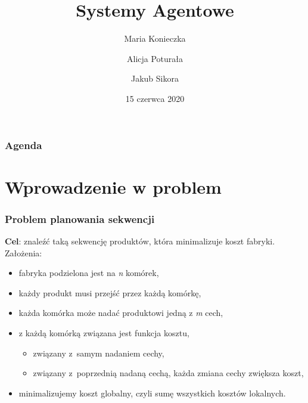 \documentclass{beamer}
\title[SAG - Projekt]{Systemy Agentowe}
\author[Konieczka, Poturała, Sikora]{Maria Konieczka \and Alicja Poturała \and Jakub Sikora}
\date{15 czerwca 2020}
\institute[]{Planowanie pracy w fabryce\\Prowadzący: dr inż. Dominik Ryżko}
\begin{document}
\begin{frame}
    \titlepage
\end{frame}

\begin{frame}
    \frametitle{Agenda}
    \tableofcontents
\end{frame}

\section{Wprowadzenie w problem}
\begin{frame}
    \frametitle{Problem planowania sekwencji}
    \textbf{Cel}: znaleźć taką sekwencję produktów, która minimalizuje koszt fabryki.\\
    \medskip    
    Założenia:
    \begin{itemize}
        \item fabryka podzielona jest na \emph{n} komórek,
        \item każdy produkt musi przejść przez każdą komórkę,
        \item każda komórka może nadać produktowi jedną z \emph{m} cech,
        \item z każdą komórką związana jest funkcja kosztu,
        \begin{itemize}
            \item związany z~samym nadaniem cechy,
            \item związany z~poprzednią nadaną cechą, każda zmiana cechy zwiększa koszt,
        \end{itemize} 
        \item minimalizujemy koszt globalny, czyli sumę wszystkich kosztów lokalnych.
    \end{itemize}
\end{frame}
\end{document}
